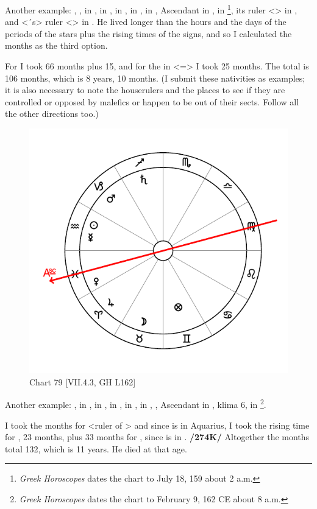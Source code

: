 Another example: \Sun, \Venus, \Mercury\xspace in \Cancer, \Moon\xspace in \Capricorn, \Saturn\xspace in \Scorpio, \Jupiter\xspace in \Aquarius, \Mars\xspace in \Leo, Ascendant in \Taurus, \Fortune\xspace in \Scorpio\footnote{\textit{Greek Horoscopes} dates the chart to July 18, 159 about 2 a.m.}, its ruler <\Mars> in \Leo, and <\Leo´s> ruler <\Sun> in \Cancer. He lived longer than the hours and the days of the periods of the stars plus the rising times of the signs, and so I calculated the months as the third option. 

For \Mars\xspace I took 66 months plus 15, and for the \Sun\xspace in \Cancer <=\Moon> I took 25 months. The total is 106 months, which is 8 years, 10 months. (I submit these nativities as examples; it is also necessary to note the houserulers and the places to see
if they are controlled or opposed by malefics or happen to be out of their sects. Follow all the other directions too.)

\newpage
\begin{figure}
\centering
\vspace{-10pt}
\includegraphics[width=.68\textwidth]{charts/7_4_3}
\caption{Chart 79 [VII.4.3, GH L162]}
\label{fig:chart79}
\end{figure} 

Another example: \Sun, \Mercury\xspace in \Aquarius, \Moon\xspace in \Taurus, \Saturn\xspace in \Sagittarius, \Jupiter\xspace in \Aries,
\Mars\xspace in \Capricorn, \Venus, Ascendant in \Pisces, klima 6, \Fortune\xspace in \Gemini\footnote{\textit{Greek Horoscopes} dates the chart to February 9, 162 CE about 8 a.m.}. 

I took the months for \Mercury\xspace <ruler of \Gemini> and since \Mercury\xspace is in Aquarius, I took the rising time for \Aquarius, 23 months, plus 33 months for \Sagittarius, since \Saturn\xspace is in \Sagittarius. \textbf{/274K/} Altogether the months total 132, which is 11 years. He died at that age. 

